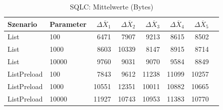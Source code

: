 
\begin{table}[ht]
\setlength{\extrarowheight}{-1pt}
\centering
\caption{SQLC: Mittelwerte (Bytes)}
\begin{tabular}{llrrrrrr}
\toprule
Szenario & Parameter & ${\Delta \overline{X}_1}$ & ${\Delta \overline{X}_2}$ & ${\Delta \overline{X}_3}$ & ${\Delta \overline{X}_4}$ & ${\Delta \overline{X}_5}$ \\
\midrule
	List & 100 & 6471 & 7907 & 9213 & 8615 & 8502 \\
	List & 1000 & 8603 & 10339 & 8147 & 8915 & 8714 \\
	List & 10000 & 9760 & 9031 & 9070 & 9584 & 8849 \\
	ListPreload & 100 & 7843 & 9612 & 11238 & 11099 & 10257 \\
	ListPreload & 1000 & 10551 & 12351 & 10011 & 10882 & 10665 \\
	ListPreload & 10000 & 11927 & 10743 & 10953 & 11383 & 10770 \\
\bottomrule
\end{tabular}
\label{tab:mittelwerte_sqlc_bytes}
\end{table}
	